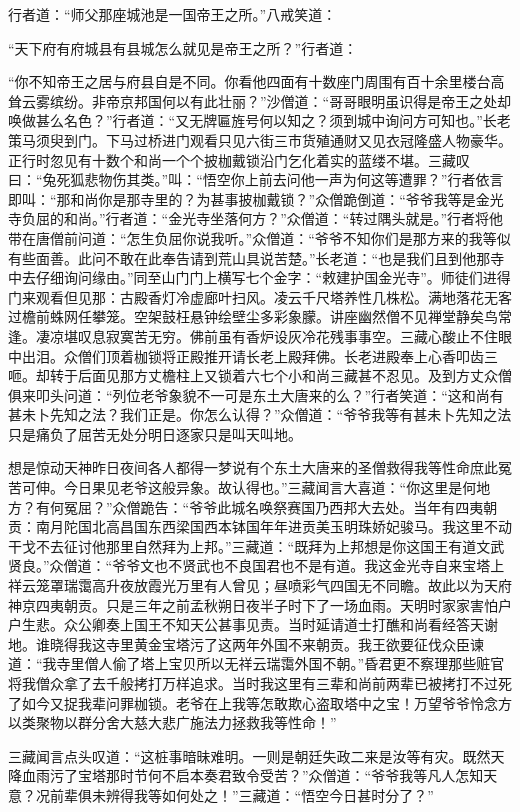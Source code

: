 \documentclass[12pt,UTF8]{ctexbook}
\begin{document}
行者道：“师父那座城池是一国帝王之所。”八戒笑道：

“天下府有府城县有县城怎么就见是帝王之所？”行者道：

“你不知帝王之居与府县自是不同。你看他四面有十数座门周围有百十余里楼台高耸云雾缤纷。非帝京邦国何以有此壮丽？”沙僧道：“哥哥眼明虽识得是帝王之处却唤做甚么名色？”行者道：“又无牌匾旌号何以知之？须到城中询问方可知也。”长老策马须臾到门。下马过桥进门观看只见六街三市货殖通财又见衣冠隆盛人物豪华。正行时忽见有十数个和尚一个个披枷戴锁沿门乞化着实的蓝缕不堪。三藏叹曰：“兔死狐悲物伤其类。”叫：“悟空你上前去问他一声为何这等遭罪？”行者依言即叫：“那和尚你是那寺里的？为甚事披枷戴锁？”众僧跪倒道：“爷爷我等是金光寺负屈的和尚。”行者道：“金光寺坐落何方？”众僧道：“转过隅头就是。”行者将他带在唐僧前问道：“怎生负屈你说我听。”众僧道：“爷爷不知你们是那方来的我等似有些面善。此问不敢在此奉告请到荒山具说苦楚。”长老道：“也是我们且到他那寺中去仔细询问缘由。”同至山门门上横写七个金字：“敕建护国金光寺”。师徒们进得门来观看但见那：古殿香灯冷虚廊叶扫风。凌云千尺塔养性几株松。满地落花无客过檐前蛛网任攀笼。空架鼓枉悬钟绘壁尘多彩象朦。讲座幽然僧不见禅堂静矣鸟常逢。凄凉堪叹息寂寞苦无穷。佛前虽有香炉设灰冷花残事事空。三藏心酸止不住眼中出泪。众僧们顶着枷锁将正殿推开请长老上殿拜佛。长老进殿奉上心香叩齿三咂。却转于后面见那方丈檐柱上又锁着六七个小和尚三藏甚不忍见。及到方丈众僧俱来叩头问道：“列位老爷象貌不一可是东土大唐来的么？”行者笑道：“这和尚有甚未卜先知之法？我们正是。你怎么认得？”众僧道：“爷爷我等有甚未卜先知之法只是痛负了屈苦无处分明日逐家只是叫天叫地。

想是惊动天神昨日夜间各人都得一梦说有个东土大唐来的圣僧救得我等性命庶此冤苦可伸。今日果见老爷这般异象。故认得也。”三藏闻言大喜道：“你这里是何地方？有何冤屈？”众僧跪告：“爷爷此城名唤祭赛国乃西邦大去处。当年有四夷朝贡：南月陀国北高昌国东西梁国西本钵国年年进贡美玉明珠娇妃骏马。我这里不动干戈不去征讨他那里自然拜为上邦。”三藏道：“既拜为上邦想是你这国王有道文武贤良。”众僧道：“爷爷文也不贤武也不良国君也不是有道。我这金光寺自来宝塔上祥云笼罩瑞霭高升夜放霞光万里有人曾见；昼喷彩气四国无不同瞻。故此以为天府神京四夷朝贡。只是三年之前孟秋朔日夜半子时下了一场血雨。天明时家家害怕户户生悲。众公卿奏上国王不知天公甚事见责。当时延请道士打醮和尚看经答天谢地。谁晓得我这寺里黄金宝塔污了这两年外国不来朝贡。我王欲要征伐众臣谏道：“我寺里僧人偷了塔上宝贝所以无祥云瑞霭外国不朝。”昏君更不察理那些赃官将我僧众拿了去千般拷打万样追求。当时我这里有三辈和尚前两辈已被拷打不过死了如今又捉我辈问罪枷锁。老爷在上我等怎敢欺心盗取塔中之宝！万望爷爷怜念方以类聚物以群分舍大慈大悲广施法力拯救我等性命！”

三藏闻言点头叹道：“这桩事暗昧难明。一则是朝廷失政二来是汝等有灾。既然天降血雨污了宝塔那时节何不启本奏君致令受苦？”众僧道：“爷爷我等凡人怎知天意？况前辈俱未辨得我等如何处之！”三藏道：“悟空今日甚时分了？”
\end{document}
